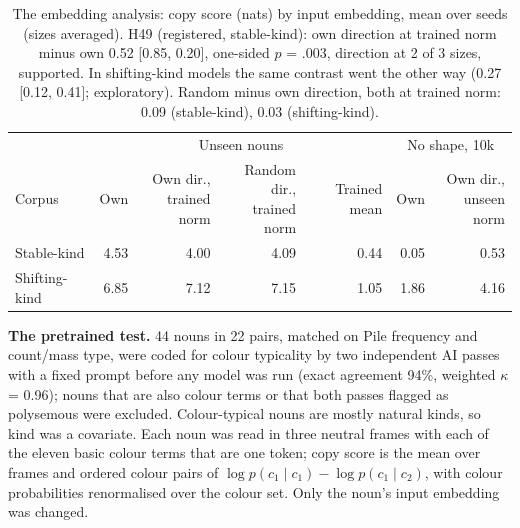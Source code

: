 \begin{table}[!htbp]
\centering\small
\caption{The embedding analysis: copy score (nats) by input embedding, mean over seeds (sizes averaged). H49 (registered, stable-kind): own direction at trained norm minus own \textminus{}0.52 [\textminus{}0.85, \textminus{}0.20], one-sided $p$ = .003, direction at 2 of 3 sizes, supported. In shifting-kind models the same contrast went the other way (0.27 [0.12, 0.41]; exploratory). Random minus own direction, both at trained norm: 0.09 (stable-kind), 0.03 (shifting-kind).}
\label{tab:N5}
\begin{tabular}{@{}lrrrrrr@{}}
\toprule
 & \multicolumn{4}{c}{Unseen nouns} & \multicolumn{2}{c}{No shape, 10k} \\ \cmidrule(lr){2-5}\cmidrule(lr){6-7}
Corpus & Own & \shortstack{Own dir.,\\trained norm} & \shortstack{Random dir.,\\trained norm} & Trained mean & Own & \shortstack{Own dir.,\\unseen norm} \\
\midrule
Stable-kind & 4.53 & 4.00 & 4.09 & \textminus{}0.44 & \textminus{}0.05 & 0.53 \\
Shifting-kind & 6.85 & 7.12 & 7.15 & 1.05 & 1.86 & 4.16 \\
\bottomrule
\end{tabular}
\end{table}

\textbf{The pretrained test.} 44 nouns in 22 pairs, matched on Pile frequency and count/mass type, were coded for colour typicality by two independent AI passes with a fixed prompt before any model was run (exact agreement 94\%, weighted $\kappa$ = 0.96); nouns that are also colour terms or that both passes flagged as polysemous were excluded. Colour-typical nouns are mostly natural kinds, so kind was a covariate. Each noun was read in three neutral frames with each of the eleven basic colour terms that are one token; copy score is the mean over frames and ordered colour pairs of $\log p(c_1 \mid c_1) - \log p(c_1 \mid c_2)$, with colour probabilities renormalised over the colour set. Only the noun's input embedding was changed.

